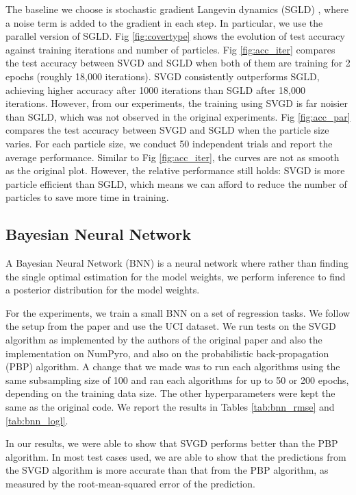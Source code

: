The baseline we choose is stochastic gradient Langevin dynamics (SGLD) \cite{ref_sgld}, where a noise term is added to the gradient in each step. In particular, we use the parallel version of SGLD. Fig \ref{fig:covertype} shows the evolution of test accuracy against training iterations and number of particles. Fig \ref{fig:acc_iter} compares the test accuracy between SVGD and SGLD when both of them are training for 2 epochs (roughly 18,000 iterations). SVGD consistently outperforms SGLD, achieving higher accuracy after 1000 iterations than SGLD after 18,000 iterations. However, from our experiments, the training using SVGD is far noisier than SGLD, which was not observed in the original experiments. Fig \ref{fig:acc_par} compares the test accuracy between SVGD and SGLD when the particle size varies. For each particle size, we conduct 50 independent trials and report the average performance. Similar to Fig \ref{fig:acc_iter}, the curves are not as smooth as the original plot. However, the relative performance still holds: SVGD is more particle efficient than SGLD, which means we can afford to reduce the number of particles to save more time in training.


\subsection{Bayesian Neural Network}

A Bayesian Neural Network (BNN) is a neural network where rather than finding the single optimal estimation for the model weights, we perform inference to find a posterior distribution for the model weights.

For the experiments, we train a small BNN on a set of regression tasks. We follow the setup from the paper and use the UCI dataset. We run tests on the SVGD algorithm as implemented by the authors of the original paper and also the implementation on NumPyro, and also on the probabilistic back-propagation (PBP) algorithm. A change that we made was to run each algorithms using the same subsampling size of 100 and ran each algorithms for up to 50 or 200 epochs, depending on the training data size. The other hyperparameters were kept the same as the original code. We report the results in Tables \ref{tab:bnn_rmse} and \ref{tab:bnn_logl}. 



In our results, we were able to show that SVGD performs better than the PBP algorithm. In most test cases used, we are able to show that the predictions from the SVGD algorithm is more accurate than that from the PBP algorithm, as measured by the root-mean-squared error of the prediction. 

